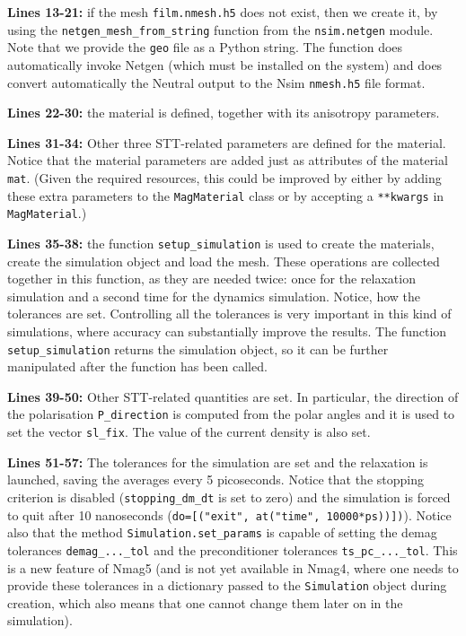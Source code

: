 \documentclass[11pt,oneside,openany]{article}
\begin{document}
\textbf{Lines 13-21:} if the mesh \verb|film.nmesh.h5| does not exist, then
we create it, by using the \verb|netgen_mesh_from_string| function from the
\verb|nsim.netgen| module. Note that we provide the \texttt{geo} file as a Python
string. The function does automatically invoke Netgen (which must be installed
on the system) and does convert automatically the Neutral output to the
Nsim \verb|nmesh.h5| file format.

\textbf{Lines 22-30:} the material is defined, together with its anisotropy
parameters.

\textbf{Lines 31-34:} Other three STT-related parameters are defined
for the material. Notice that the material parameters are added just
as attributes of the material \verb|mat|. (Given the required
resources, this could be improved by either by adding these extra
parameters to the \verb|MagMaterial| class or by accepting a
\verb|**kwargs| in \verb|MagMaterial|.)

\textbf{Lines 35-38:} the function \verb|setup_simulation| is used to create
the materials, create the simulation object and load the mesh. These operations
are collected together in this function, as they are needed twice: once for the
relaxation simulation and a second time for the dynamics simulation.  Notice,
how the tolerances are set. Controlling all the tolerances is very important in
this kind of simulations, where accuracy can substantially improve the
results. The function \verb|setup_simulation| returns the simulation object, so
it can be further manipulated after the function has been called.

\textbf{Lines 39-50:} Other STT-related quantities are set. In particular,
the direction of the polarisation \verb|P_direction| is computed from the
polar angles and it is used to set the vector \verb|sl_fix|.
The value of the current density is also set. 

\textbf{Lines 51-57:} The tolerances for the simulation are set
and the relaxation is launched, saving the averages every 5 picoseconds.
Notice that the stopping criterion is disabled (\verb|stopping_dm_dt| is set
to zero) and the simulation is forced to quit after 10 nanoseconds
(\verb|do=[("exit", at("time", 10000*ps))])|).
Notice also that the method \verb|Simulation.set_params| is capable
of setting the demag tolerances \verb|demag_..._tol| and the preconditioner
tolerances \verb|ts_pc_..._tol|. This is a new feature of Nmag5 (and is
not yet available in Nmag4, where one needs to provide these tolerances
in a dictionary passed to the \verb|Simulation| object during creation,
which also means that one cannot change them later on in the simulation).
\end{document}
